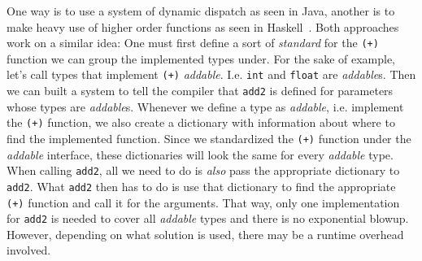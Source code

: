 One way is to use a system of dynamic dispatch as seen in Java, another is to make heavy use of higher order functions as seen in Haskell~\cite{type-classes-original}. Both approaches work on a similar idea: One must first define a sort of \textit{standard} for the \verb|(+)| function we can group the implemented types under. For the sake of example, let's call types that implement \verb|(+)| \textit{addable}. I.e. \verb|int| and \verb|float| are \textit{addable}s. Then we can built a system to tell the compiler that \verb|add2| is defined for parameters whose types are \textit{addable}s. Whenever we define a type as \textit{addable}, i.e. implement the \verb|(+)| function, we also create a dictionary with information about where to find the implemented function. Since we standardized the \verb|(+)| function under the \textit{addable} interface, these dictionaries will look the same for every \textit{addable} type. When calling \verb|add2|, all we need to do is \textit{also} pass the appropriate dictionary to \verb|add2|. What \verb|add2| then has to do is use that dictionary to find the appropriate \verb|(+)| function and call it for the arguments. That way, only one implementation for \verb|add2| is needed to cover all \textit{addable} types and there is no exponential blowup. However, depending on what solution is used, there may be a runtime overhead involved.
